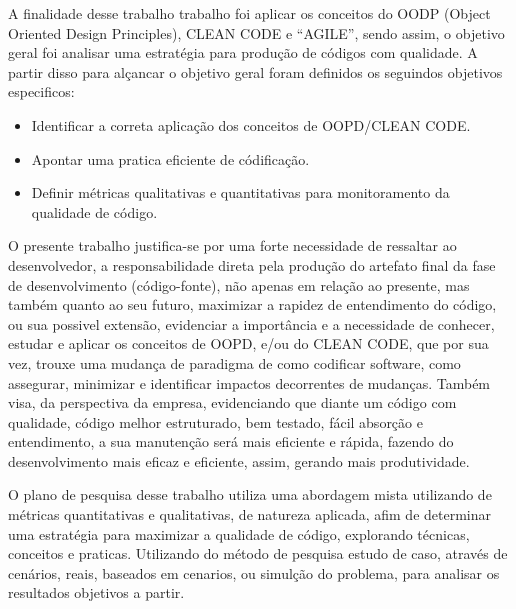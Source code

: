 \documentclass[12pt]{article}
\begin{document}
A finalidade desse trabalho trabalho foi aplicar os conceitos do OODP (Object Oriented Design Principles), CLEAN CODE e “AGILE”, sendo assim, o objetivo geral foi analisar uma estratégia para produção de códigos com qualidade. A partir disso para alçancar o objetivo geral foram definidos os seguindos objetivos especificos: 
\begin{itemize}
	\item Identificar a correta aplicação dos conceitos de OOPD/CLEAN CODE.
	\item Apontar uma pratica eficiente de códificação.
	\item Definir métricas qualitativas e quantitativas para monitoramento da qualidade de código.
\end{itemize} 

O presente trabalho justifica-se por uma forte necessidade de ressaltar ao desenvolvedor, a responsabilidade direta pela produção do artefato final da fase de desenvolvimento (código-fonte), não apenas em relação ao presente, mas também quanto ao seu futuro, maximizar a rapidez de entendimento do código, ou sua possivel extensão, evidenciar a importância e a necessidade de conhecer, estudar e aplicar os conceitos de OOPD, e/ou do CLEAN CODE, que por sua vez, trouxe uma mudança de paradigma de como codificar software, como assegurar, minimizar e identificar impactos decorrentes de mudanças.
Também visa, da perspectiva da empresa, evidenciando que diante um código com qualidade, código melhor estruturado, bem testado, fácil absorção e entendimento, a sua manutenção será mais eficiente e rápida, fazendo do desenvolvimento mais eficaz e eficiente, assim, gerando mais produtividade.

O plano de pesquisa desse trabalho utiliza uma abordagem mista utilizando de métricas quantitativas e qualitativas, de natureza aplicada, afim de determinar uma estratégia para maximizar a qualidade de código, explorando técnicas, conceitos e praticas. Utilizando do método de pesquisa estudo de caso, através de cenários, reais, baseados em cenarios, ou simulção do problema, para analisar os resultados objetivos a partir. 
\end{document}
